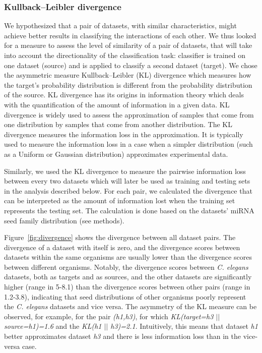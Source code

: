 \documentclass{bmcart}
\begin{document}
\subsubsection*{Kullback–Leibler divergence}
We hypothesized that a pair of datasets, with similar characteristics, might achieve better results in classifying the interactions of each other. We thus looked for a measure to assess the level of similarity of a pair of datasets, that will take into account the directionality of the classification task: classifier is trained on one dataset (source) and is applied to classify a second dataset (target).
We chose the asymmetric measure Kullback–Leibler (KL) divergence which measures how the target's probability distribution is different from the probability distribution of the source. KL divergence has its origins in information theory which deals with the quantification of the amount of information in a given data. KL divergence is widely used to assess the approximation of samples that come from one distribution by samples that come from another distribution. The KL divergence measures the information loss in the approximation. It is typically used to measure the information loss in a case when a simpler distribution (such as a Uniform or Gaussian distribution) approximates experimental data.

Similarly, we used the KL divergence to measure the pairwise information loss between every two datasets which will later be used as training and testing sets in the analysis described below. For each pair, we calculated the divergence that can be interpreted as the amount of information lost when the training set represents the testing set. The calculation is done based on the datasets' miRNA seed family distribution (see methods).

Figure~\ref{fig:divergence} shows the divergence between all dataset pairs. The divergence of a dataset with itself is zero, and the divergence scores between datasets within the same organisms are usually lower than the divergence scores between different organisms. Notably, the divergence scores between \textit{C. elegans} datasets, both as targets and as sources, and the other datasets are significantly higher (range in 5-8.1) than the divergence scores between other pairs (range in 1.2-3.8), indicating that seed distributions of other organisms poorly represent the \textit{C. elegans} datasets and vice versa. The asymmetry of the KL measure can be observed, for example, for the pair \textit{(h1,h3)}, for which \textit{KL(target=h3 $||$ source=h1)=1.6} and the  \textit{KL(h1 $||$ h3)=2.1}. Intuitively, this means that dataset \textit{h1} better approximates dataset \textit{h3} and there is less information loss than in the vice-versa case.
\end{document}
